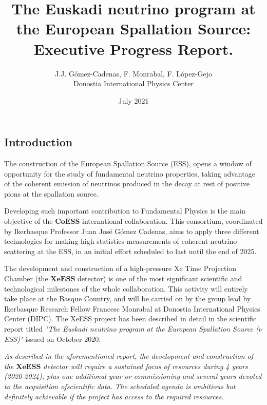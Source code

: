\documentclass[12pt,a4paper,article]{report} %
\title{The Euskadi neutrino program at the European Spallation Source: Executive Progress Report.}
\author{J.J. Gómez-Cadenas, F. Monrabal, F. L\'opez-Gejo \\ Donostia International Physics Center}
\date{July 2021} %
\begin{document}
\maketitle
\begin{centering}
\section*{Introduction}
\end{centering}
The construction of the European Spallation Source (ESS), opens a window of opportunity for the study of fundamental neutrino properties, taking advantage of the coherent emission of neutrinos produced in the decay at rest of positive pions at the spallation source. 

Developing such important contribution to Fundamental Physics is the  main objective of the $\mathbf{CoESS}$ international collaboration. This consortium, coordinated by Ikerbasque Professor Juan José Gómez Cadenas, aims to apply three different technologies for making high-statistics measurements of coherent neutrino scattering at the ESS, in an initial effort scheduled to last until the end of 2025.

The development and construction of a high-pressure Xe Time Projection Chamber (the $\mathbf{XeESS}$ detector) is one of the most significant scientific and technological milestones of the whole collaboration. This activity will entirely take place at the Basque Country, and will be carried on by the group lead by Ikerbasque Research Fellow Francesc Monrabal at Donostia International Physics Center (DIPC). The XeESS project has been described in detail in the scientific report titled \emph{"The Euskadi neutrino program at the European Spallation Source ($\nu$ESS)"} issued on October 2020. 


\begin{tcolorbox}


\emph{As described in the aforementioned report, the development and construction of the $\mathbf{XeESS}$  detector will require a sustained focus of resources during 4 years (2020-2024), plus one additional year or commissioning and several years devoted to the acquisition ofscientific data. The scheduled agenda is ambitious but definitely achievable if the project has access to the required resources.}


\end{tcolorbox}
\end{document}
